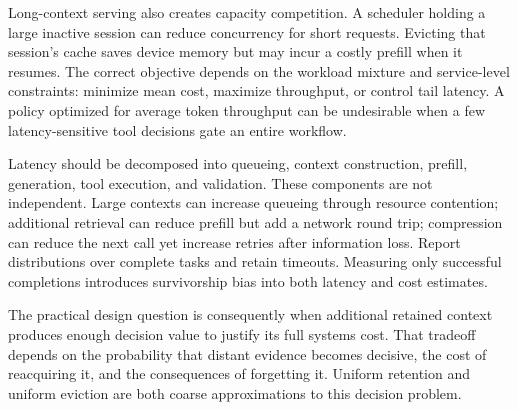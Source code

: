 Long-context serving also creates capacity competition. A scheduler holding a large inactive session can reduce concurrency for short requests. Evicting that session's cache saves device memory but may incur a costly prefill when it resumes. The correct objective depends on the workload mixture and service-level constraints: minimize mean cost, maximize throughput, or control tail latency. A policy optimized for average token throughput can be undesirable when a few latency-sensitive tool decisions gate an entire workflow.

Latency should be decomposed into queueing, context construction, prefill, generation, tool execution, and validation. These components are not independent. Large contexts can increase queueing through resource contention; additional retrieval can reduce prefill but add a network round trip; compression can reduce the next call yet increase retries after information loss. Report distributions over complete tasks and retain timeouts. Measuring only successful completions introduces survivorship bias into both latency and cost estimates.

The practical design question is consequently when additional retained context produces enough decision value to justify its full systems cost. That tradeoff depends on the probability that distant evidence becomes decisive, the cost of reacquiring it, and the consequences of forgetting it. Uniform retention and uniform eviction are both coarse approximations to this decision problem.

